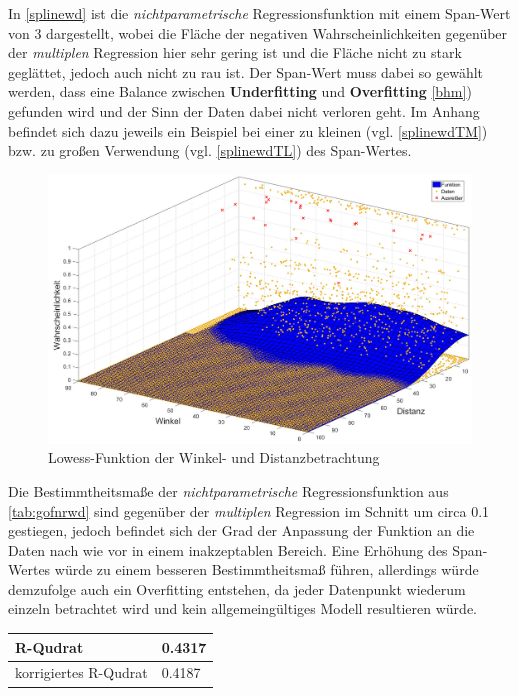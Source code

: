 In \vref{splinewd} ist die \textit{nichtparametrische} Regressionsfunktion mit einem Span-Wert von \textsf{3} dargestellt, wobei die Fläche der negativen Wahrscheinlichkeiten gegenüber der \textit{multiplen} Regression hier sehr gering ist und die Fläche nicht zu stark geglättet, jedoch auch nicht zu rau ist. Der Span-Wert muss dabei so gewählt werden, dass eine Balance zwischen \textbf{Underfitting} und \textbf{Overfitting} \vref{bhm}) gefunden wird und der Sinn der Daten dabei nicht verloren geht. Im Anhang befindet sich dazu jeweils ein Beispiel bei einer zu kleinen (vgl. \vref{splinewdTM}) bzw. zu großen Verwendung (vgl. \vref{splinewdTL}) des Span-Wertes.

\begin{figure}[H]
\centering
\includegraphics[scale=0.34]{se-wa-jpg/splinewd}
\caption{Lowess-Funktion der Winkel- und Distanzbetrachtung}
\label{splinewd}
\end{figure}

Die Bestimmtheitsmaße der \textit{nichtparametrische} Regressionsfunktion aus \vref{tab:gofnrwd} sind gegenüber der \textit{multiplen} Regression im Schnitt um circa \textsf{0.1} gestiegen, jedoch befindet sich der Grad der Anpassung der Funktion an die Daten nach wie vor in einem inakzeptablen Bereich. Eine Erhöhung des Span-Wertes würde zu einem besseren Bestimmtheitsmaß führen, allerdings würde demzufolge auch ein Overfitting entstehen, da jeder Datenpunkt wiederum einzeln betrachtet wird und kein allgemeingültiges Modell resultieren würde.

\tablehead{}
\tabletail{}
\tablelasttail{}
\begin{center}%
\begin{supertabular}{ | P{6cm} | P{3cm}  |}
\textsf{R-Qudrat} 	& 0.4317	\\
\hline
\textsf{korrigiertes R-Qudrat} 	&  0.4187	\\
\hline
\end{supertabular}
\end{center}

